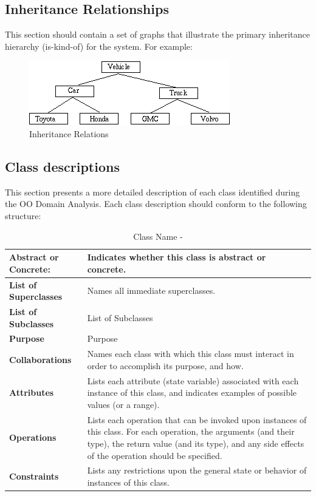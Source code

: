 \documentclass[]{article}
\begin{document}
\subsection{Inheritance Relationships}
This section should contain a set of graphs that illustrate the primary inheritance hierarchy (is-kind-of) for the system. For example: 

\begin{figure}[tbh]
\centering
\includegraphics[width=0.7\linewidth]{./image}
\caption{Inheritance Relations}
\label{fig:image}
\end{figure}

\subsection{Class descriptions}
This section presents a more detailed description of each class identified during the OO Domain Analysis.
Each class description should conform to the following structure: 

\begin{table}[h]
\caption{Class Name - }
\label{tab:my-table}
\begin{tabular}{|p{}|p{}|}
\hline
\textbf{Abstract or Concrete:} & Indicates whether this class is abstract or concrete.
\\ \hline
\textbf{List of Superclasses}  & Names all immediate superclasses.                                                       
\\ \hline
\textbf{List of Subclasses}    & List of Subclasses                                                                      
\\ \hline
\textbf{Purpose}               & Purpose                                                                                 
\\ \hline
\textbf{Collaborations}        & Names each class with which this class must interact in order to accomplish its purpose, and how.
\\ \hline
\textbf{Attributes}            & Lists each attribute (state variable) associated with each instance of this class, and indicates examples of possible values (or a range).
\\ \hline
\textbf{Operations}            & Lists each operation that can be invoked upon instances of this class.  For each operation, the arguments (and their type), the return value (and its type), and any side effects of the operation should be specified. 
\\ \hline
\textbf{Constraints}           & Lists any restrictions upon the general state or behavior of instances of this class.   
\\ \hline
\end{tabular}
\end{table}
\end{document}
